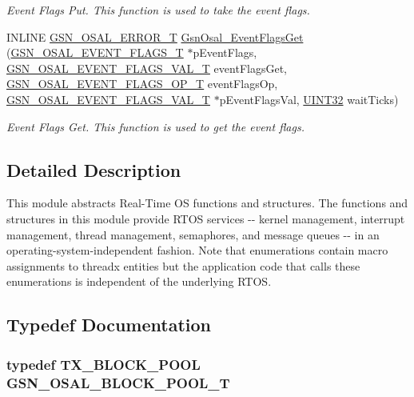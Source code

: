 \begin{DoxyCompactItemize}
\begin{DoxyCompactList}\small\item\em Event Flags Put. This function is used to take the event flags. \end{DoxyCompactList}\item 
INLINE \hyperlink{a00659_ga36216a7aacd1d5024bc7b8bf39c3f46b}{GSN\_\-OSAL\_\-ERROR\_\-T} \hyperlink{a00628_gaf776c600539bb9e5945b60e17cef7a4f}{GsnOsal\_\-EventFlagsGet} (\hyperlink{a00628_gab93fdfc637101a29260ca105d3eb924e}{GSN\_\-OSAL\_\-EVENT\_\-FLAGS\_\-T} $\ast$pEventFlags, \hyperlink{a00536_afb39f905ce07232becc42deeccb9ad4c}{GSN\_\-OSAL\_\-EVENT\_\-FLAGS\_\-VAL\_\-T} eventFlagsGet, \hyperlink{a00536_a3782687de549490574b44f3374fb5731}{GSN\_\-OSAL\_\-EVENT\_\-FLAGS\_\-OP\_\-T} eventFlagsOp, \hyperlink{a00536_afb39f905ce07232becc42deeccb9ad4c}{GSN\_\-OSAL\_\-EVENT\_\-FLAGS\_\-VAL\_\-T} $\ast$pEventFlagsVal, \hyperlink{a00660_gae1e6edbbc26d6fbc71a90190d0266018}{UINT32} waitTicks)
\begin{DoxyCompactList}\small\item\em Event Flags Get. This function is used to get the event flags. \end{DoxyCompactList}\end{DoxyCompactItemize}


\subsection{Detailed Description}
This module abstracts Real-\/Time OS functions and structures. The functions and structures in this module provide RTOS services -\/-\/ kernel management, interrupt management, thread management, semaphores, and message queues -\/-\/ in an operating-\/system-\/independent fashion. Note that enumerations contain macro assignments to threadx entities but the application code that calls these enumerations is independent of the underlying RTOS. 

\subsection{Typedef Documentation}
\hypertarget{a00628_ga6adbb87a82d8b5936dd6f535024d81b7}{
\subsubsection[{GSN\_\-OSAL\_\-BLOCK\_\-POOL\_\-T}]{\setlength{\rightskip}{0pt plus 5cm}typedef TX\_\-BLOCK\_\-POOL {\bf GSN\_\-OSAL\_\-BLOCK\_\-POOL\_\-T}}}
\label{a00628_ga6adbb87a82d8b5936dd6f535024d81b7}


